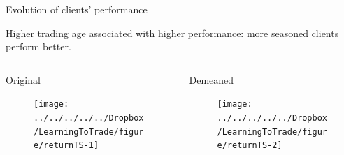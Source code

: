 \documentclass{beamer}
\begin{document}
\begin{frame}{Evolution of clients' performance}

Higher trading age associated with higher performance: more seasoned clients perform better.

		\begin{columns}[t]
		\begin{column}{0.495\textwidth}
			\begin{block}{Original}
				\begin{figure}
					\texttt{[image: ../../../../../Dropbox/LearningToTrade/figure/returnTS-1]}
				\end{figure}
			\end{block}
		\end{column}

		\begin{column}{0.495\textwidth}
			\begin{block}{Demeaned}
				\begin{figure}
					\texttt{[image: ../../../../../Dropbox/LearningToTrade/figure/returnTS-2]}
				\end{figure}
			\end{block}
		\end{column}
	\end{columns}


\end{frame}
\end{document}
